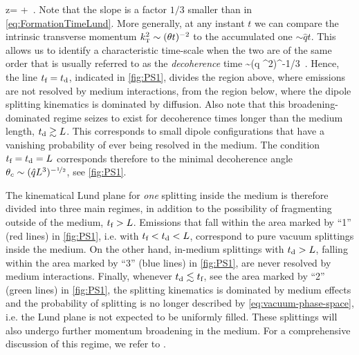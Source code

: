 \beq
\log z\theta =  \log {} + \log {} \,.
\eeq
Note that the slope is a factor $1/3$ smaller than in \eqref{eq:FormationTimeLund}.
More generally, at any instant $t$ we can compare the intrinsic transverse momentum $k_{\text{\tiny T}}^2 \sim (\theta t)^{-2}$ to the accumulated one $\sim \hat q t$. This allows us to identify a characteristic time-scale when the two are of the same order that is usually referred to as the {\sl decoherence} time
\beq
\tdecoh \sim (\hat q \theta^2)^{-1/3} \,.
\eeq
Hence, the line $t_\text{f} = t_\text{d}$, indicated in \autoref{fig:PS1}, divides the region above, where emissions are not resolved by medium interactions, from the region below, where the dipole splitting kinematics is dominated by diffusion.
Also note that this broadening-dominated regime seizes to exist for decoherence times longer than the medium length, $t_\text{d} \gtrsim L$. This corresponds to small dipole configurations that have a vanishing probability of ever being resolved in the medium. The condition $t_\text{f} = t_\text{d} = L$ corresponds therefore to the minimal decoherence angle $\theta_c \sim (\hat q L^3)^{-{\nicefrac{1}{2}}}$, see \autoref{fig:PS1}.

The kinematical Lund plane for {\sl one} splitting inside the medium is therefore divided into three main regimes, in addition to the possibility of fragmenting outside of the medium, $t_\text{f} > L$.
Emissions that fall within the area marked by ``1'' (red lines) in \autoref{fig:PS1}, i.e. with $t_\text{f}< t_\text{d} < L$, correspond to pure vacuum splittings inside the medium. On the other hand, in-medium splittings with $t_\text{d} > L$, falling within the area marked by ``3'' (blue lines) in \autoref{fig:PS1}, are never resolved by medium interactions.
Finally, whenever $t_\text{d} \lesssim t_\text{f}$, see the area marked by ``2'' (green lines) in \autoref{fig:PS1}, the splitting kinematics is dominated by medium effects and the probability of splitting is no longer described by \autoref{eq:vacuum-phase-space}, i.e. the Lund plane is not expected to be uniformly filled. These splittings will also undergo further momentum broadening in the medium. For a comprehensive discussion of this regime, we refer to \cite{Kurkela:2014tla,Blaizot:2014rla}.


